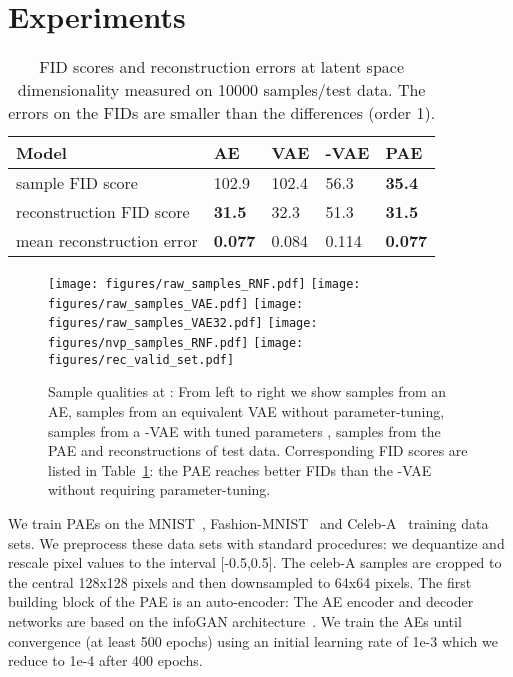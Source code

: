 \documentclass{article}
\begin{document}
\section{Experiments}
\label{sec:exp}
\begin{table}
  \caption{FID scores and reconstruction errors at latent space dimensionality  measured on 10000 samples/test data. The errors on the FIDs are smaller than the differences (order 1).}
  \label{tab:FID}
  \centering
  \begin{tabular}{lllll}
    Model            & AE  & VAE & -VAE & PAE \\
    \midrule
    sample FID score  &    102.9 &  102.4   &   56.3      & \textbf{35.4}\\
    reconstruction FID score  &     \textbf{31.5} &   32.3   &     51.3    & \textbf{31.5}\\
    mean reconstruction error  &    \textbf{0.077} &   0.084  &  0.114 & \textbf{0.077}\\
    \bottomrule
  \end{tabular}
\end{table}
\begin{figure}
\texttt{[image: figures/raw\_samples\_RNF.pdf]}
\texttt{[image: figures/raw\_samples\_VAE.pdf]}
\texttt{[image: figures/raw\_samples\_VAE32.pdf]}
\texttt{[image: figures/nvp\_samples\_RNF.pdf]}
\texttt{[image: figures/rec\_valid\_set.pdf]}
\caption{Sample qualities at : From left to right we show samples from an AE, samples from an equivalent VAE without parameter-tuning, samples from a -VAE with tuned parameters , samples from the PAE and reconstructions of test data. Corresponding FID scores are listed in Table~\ref{tab:FID}: the PAE reaches better FIDs than the -VAE without requiring parameter-tuning.}
\label{fig:fmnist32}
\end{figure}
We train PAEs on the MNIST~\citep{LecunMNIST}, Fashion-MNIST~\citep{f-mnist} and Celeb-A~\citep{celeba} training data sets. We preprocess these data sets with standard procedures: we dequantize and rescale pixel values to the interval [-0.5,0.5]. The celeb-A samples are cropped to the central 128x128 pixels and then downsampled to 64x64 pixels. 
The first building block of the PAE is an auto-encoder: The AE encoder and decoder networks are based on the infoGAN architecture~\citep{infoGAN}. We train the AEs until convergence (at least 500 epochs) using an initial learning rate of 1e-3 which we reduce to 1e-4 after 400 epochs.
\end{document}
